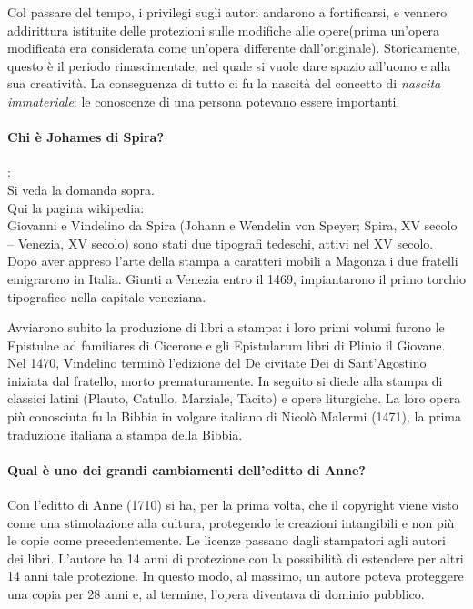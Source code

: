 \documentclass[a4paper]{article}
\begin{document}
		Col passare del tempo, i privilegi sugli autori andarono a fortificarsi, e vennero addirittura istituite delle protezioni sulle modifiche alle opere(prima un'opera modificata era considerata come un'opera differente dall'originale).
		Storicamente, questo è il periodo rinascimentale, nel quale si vuole dare spazio all'uomo e alla sua creatività.
		La conseguenza di tutto ci fu la nascità del concetto di \textit{nascita immateriale}: le conoscenze di una persona potevano essere importanti.
		
		\paragraph{Chi è Johames di Spira?}: \\ %
		Si veda la domanda sopra.\\
		Qui la pagina wikipedia:\\
		Giovanni e Vindelino da Spira (Johann e Wendelin von Speyer; Spira, XV secolo – Venezia, XV secolo) sono stati due tipografi tedeschi, attivi nel XV secolo.
		Dopo aver appreso l'arte della stampa a caratteri mobili a Magonza i due fratelli emigrarono in Italia. Giunti a Venezia entro il 1469, impiantarono il primo torchio tipografico nella capitale veneziana.
		
		Avviarono subito la produzione di libri a stampa: i loro primi volumi furono le Epistulae ad familiares di Cicerone e gli Epistularum libri di Plinio il Giovane. Nel 1470, Vindelino terminò l'edizione del De civitate Dei di Sant'Agostino iniziata dal fratello, morto prematuramente. In seguito si diede alla stampa di classici latini (Plauto, Catullo, Marziale, Tacito) e opere liturgiche.
		La loro opera più conosciuta fu la Bibbia in volgare italiano di Nicolò Malermi (1471), la prima traduzione italiana a stampa della Bibbia.
		
		\paragraph{Qual è uno dei grandi cambiamenti dell'editto di Anne?}
		Con l'editto di Anne (1710) si ha, per la prima volta, che il copyright viene visto come una stimolazione alla cultura, protegendo le 
		creazioni intangibili e non più le copie come precedentemente. Le licenze passano dagli stampatori agli autori dei libri. L'autore ha 14 anni di protezione con la possibilità di estendere per altri 14 anni tale protezione. In questo modo, al massimo, un autore poteva proteggere una copia per 28 anni e, al termine, l'opera diventava di dominio pubblico.
	
\end{document}
